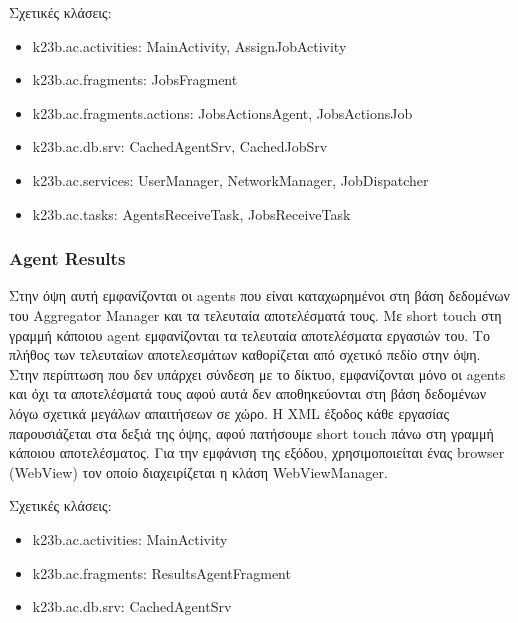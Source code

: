\documentclass[a4paper,11pt]{article}
\begin{document}
\begin{sloppypar}
Σχετικές κλάσεις:

\begin{itemize}

\item k23b.ac.activities: MainActivity, AssignJobActivity

\item k23b.ac.fragments: JobsFragment

\item k23b.ac.fragments.actions: JobsActionsAgent, JobsActionsJob

\item k23b.ac.db.srv: CachedAgentSrv, CachedJobSrv

\item k23b.ac.services: UserManager, NetworkManager, JobDispatcher

\item k23b.ac.tasks: AgentsReceiveTask, JobsReceiveTask

\end{itemize}

\subsubsection{Agent Results}

Στην όψη αυτή εμφανίζονται οι agents που είναι καταχωρημένοι στη βάση δεδομένων του Aggregator Manager και τα τελευταία αποτελέσματά τους. Με short touch στη γραμμή κάποιου agent εμφανίζονται τα τελευταία αποτελέσματα εργασιών του. Το πλήθος των τελευταίων αποτελεσμάτων καθορίζεται από σχετικό πεδίο στην όψη. Στην περίπτωση που δεν υπάρχει σύνδεση με το δίκτυο, εμφανίζονται μόνο οι agents και όχι τα αποτελέσματά τους αφού αυτά δεν αποθηκεύονται στη βάση δεδομένων λόγω σχετικά μεγάλων απαιτήσεων σε χώρο. Η XML έξοδος κάθε εργασίας παρουσιάζεται στα δεξιά της όψης, αφού πατήσουμε short touch πάνω στη γραμμή κάποιου αποτελέσματος. Για την εμφάνιση της εξόδου, χρησιμοποιείται ένας browser (WebView) τον οποίο διαχειρίζεται η κλάση WebViewManager. 
\newline

Σχετικές κλάσεις:

\begin{itemize}

\item k23b.ac.activities: MainActivity

\item k23b.ac.fragments: ResultsAgentFragment

\item k23b.ac.db.srv: CachedAgentSrv


\end{itemize}
\end{sloppypar}
\end{document}
